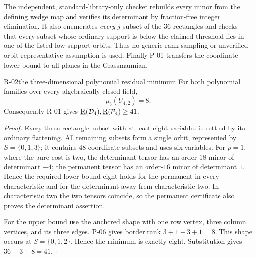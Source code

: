 The independent, standard-library-only checker
 rebuilds every minor
from the defining wedge map and verifies its determinant by
fraction-free integer elimination. It also enumerates
\emph{every} \(j\)-subset of the \(36\) rectangles and
checks that every subset whose ordinary support is below
the claimed threshold lies in one of the listed low-support
orbits. Thus no generic-rank sampling or unverified orbit
representative assumption is used. Finally P-01 transfers
the coordinate lower bound to all planes in the Grassmannian.

\begin{finding}{R-02}{the three-dimensional polynomial residual minimum}
For both polynomial families over every algebraically closed
field,
\[
 \mu_3(U_{4,2})=8.
\]
Consequently R-01 gives
\(\underline{\mathrm R}(\mathcal D_4),\underline{\mathrm R}(\mathcal P_4)\geq41\).
\end{finding}
\begin{proof}
Every three-rectangle subset with at least eight variables
is settled by its ordinary flattening. All remaining subsets
form a single orbit, represented by \(S=\{0,1,3\}\); it
contains \(48\) coordinate subsets and uses six variables.
For \(p=1\), where the pure cost is two, the determinant
tensor has an order-\(18\) minor of determinant \(-4\);
the permanent tensor has an order-\(16\) minor of determinant
\(1\). Hence the required lower bound eight holds for the
permanent in every characteristic and for the determinant
away from characteristic two. In characteristic two the
two tensors coincide, so the permanent certificate also
proves the determinant assertion.

For the upper bound use the anchored shape with one row
vertex, three column vertices, and its three edges.
P-06 gives border rank \(3+1+3+1=8\). This shape occurs
at \(S=\{0,1,2\}\). Hence the minimum is exactly eight.
Substitution gives \(36-3+8=41\).
\end{proof}

